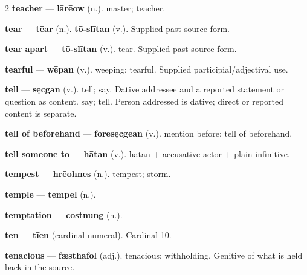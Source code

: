 \begin{multicols}{2}
\textbf{teacher} — \textbf{lārēow} (n.). master; teacher.\par
\textbf{tear} — \textbf{tēar} (n.).  \textbf{tō-slītan} (v.). Supplied past source form.\par
\textbf{tear apart} — \textbf{tō-slītan} (v.). tear. Supplied past source form.\par
\textbf{tearful} — \textbf{wēpan} (v.). weeping; tearful. Supplied participial/adjectival use.\par
\textbf{tell} — \textbf{sęcgan} (v.). tell; say. Dative addressee and a reported statement or question as content. say; tell. Person addressed is dative; direct or reported content is separate.\par
\textbf{tell of beforehand} — \textbf{foresęcgean} (v.). mention before; tell of beforehand.\par
\textbf{tell someone to} — \textbf{hātan} (v.). hātan + accusative actor + plain infinitive.\par
\textbf{tempest} — \textbf{hrēohnes} (n.). tempest; storm.\par
\textbf{temple} — \textbf{tempel} (n.).\par
\textbf{temptation} — \textbf{costnung} (n.).\par
\textbf{ten} — \textbf{tīen} (cardinal numeral). Cardinal 10.\par
\textbf{tenacious} — \textbf{fæsthafol} (adj.). tenacious; withholding. Genitive of what is held back in the source.\par

\end{multicols}

